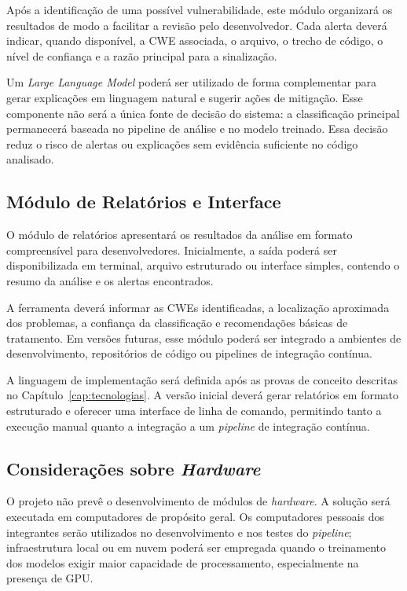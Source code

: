 Após a identificação de uma possível vulnerabilidade, este módulo
organizará os resultados de modo a facilitar a revisão pelo desenvolvedor.
Cada alerta deverá indicar, quando disponível, a CWE associada, o arquivo,
o trecho de código, o nível de confiança e a razão principal para a
sinalização.

Um \textit{Large Language Model} poderá ser utilizado de forma
complementar para gerar explicações em linguagem natural e sugerir ações
de mitigação. Esse componente não será a única fonte de decisão do
sistema: a classificação principal permanecerá baseada no pipeline de
análise e no modelo treinado. Essa decisão reduz o risco de alertas ou
explicações sem evidência suficiente no código analisado.

\subsection{Módulo de Relatórios e Interface}

O módulo de relatórios apresentará os resultados da análise em formato
compreensível para desenvolvedores. Inicialmente, a saída poderá ser
disponibilizada em terminal, arquivo estruturado ou interface simples,
contendo o resumo da análise e os alertas encontrados.

A ferramenta deverá informar as CWEs identificadas, a localização
aproximada dos problemas, a confiança da classificação e recomendações
básicas de tratamento. Em versões futuras, esse módulo poderá ser integrado
a ambientes de desenvolvimento, repositórios de código ou pipelines de
integração contínua.

A linguagem de implementação será definida após as provas de conceito
descritas no Capítulo~\ref{cap:tecnologias}. A versão inicial deverá gerar
relatórios em formato estruturado e oferecer uma interface de linha de
comando, permitindo tanto a execução manual quanto a integração a um
\textit{pipeline} de integração contínua.

\subsection{Considerações sobre \textit{Hardware}}
\label{sec:hardware}

O projeto não prevê o desenvolvimento de módulos de \textit{hardware}. A
solução será executada em computadores de propósito geral. Os computadores
pessoais dos integrantes serão utilizados no desenvolvimento e nos testes
do \textit{pipeline}; infraestrutura local ou em nuvem poderá ser empregada
quando o treinamento dos modelos exigir maior capacidade de processamento,
especialmente na presença de GPU.

